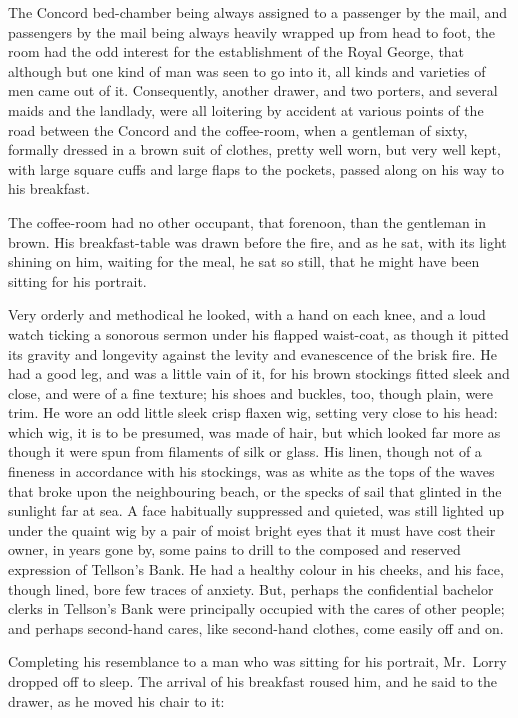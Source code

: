 The Concord bed-chamber being always assigned to a passenger by the
mail, and passengers by the mail being always heavily wrapped up from
head to foot, the room had the odd interest for the establishment of
the Royal George, that although but one kind of man was seen to go
into it, all kinds and varieties of men came out of it. Consequently,
another drawer, and two porters, and several maids and the landlady,
were all loitering by accident at various points of the road between
the Concord and the coffee-room, when a gentleman of sixty, formally
dressed in a brown suit of clothes, pretty well worn, but very well
kept, with large square cuffs and large flaps to the pockets, passed
along on his way to his breakfast.

The coffee-room had no other occupant, that forenoon, than the
gentleman in brown.  His breakfast-table was drawn before the fire,
and as he sat, with its light shining on him, waiting for the meal,
he sat so still, that he might have been sitting for his portrait.

Very orderly and methodical he looked, with a hand on each knee, and
a loud watch ticking a sonorous sermon under his flapped waist-coat,
as though it pitted its gravity and longevity against the levity and
evanescence of the brisk fire.  He had a good leg, and was a little
vain of it, for his brown stockings fitted sleek and close, and were
of a fine texture; his shoes and buckles, too, though plain, were
trim.  He wore an odd little sleek crisp flaxen wig, setting very
close to his head:  which wig, it is to be presumed, was made of hair,
but which looked far more as though it were spun from filaments of
silk or glass.  His linen, though not of a fineness in accordance
with his stockings, was as white as the tops of the waves that broke
upon the neighbouring beach, or the specks of sail that glinted in
the sunlight far at sea.  A face habitually suppressed and quieted,
was still lighted up under the quaint wig by a pair of moist bright
eyes that it must have cost their owner, in years gone by, some pains
to drill to the composed and reserved expression of Tellson's Bank.
He had a healthy colour in his cheeks, and his face, though lined,
bore few traces of anxiety.  But, perhaps the confidential bachelor
clerks in Tellson's Bank were principally occupied with the cares of
other people; and perhaps second-hand cares, like second-hand
clothes, come easily off and on.

Completing his resemblance to a man who was sitting for his portrait,
Mr.\ Lorry dropped off to sleep.  The arrival of his breakfast roused
him, and he said to the drawer, as he moved his chair to it:

